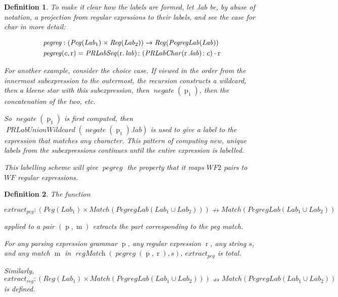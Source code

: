 \documentclass[11pt]{article}
\newcommand{\synPeg}{\ensuremath{\operatorname{p}}}
\newcommand{\synReg}{\ensuremath{\operatorname{r}}}
\newcommand{\metaMatch}{\ensuremath{\operatorname{m}}}
\newcommand{\setPeg}{\mathit{Peg}}
\newcommand{\setReg}{\mathit{Reg}}
\newcommand{\setWF}{\mathit{WF}}
\newcommand{\setWFTwo}{\mathit{WF2}}
\newcommand{\setMatch}{\mathit{Match}}
\newcommand{\setLab}{\mathit{Lab}}
\newcommand{\setPegregLab}{\mathit{PegregLab}}
\newcommand{\funPEGREG}{\operatorname{\mathit{pegreg}}}
\newcommand{\funRegMatch}{\operatorname{\mathit{regMatch}}}
\newcommand{\funNegate}{\operatorname{\mathit{negate}}}
\newcommand{\funExtractPeg}{\operatorname{\mathit{extract_{peg}}}}
\newcommand{\funExtractReg}{\operatorname{\mathit{extract_{reg}}}}
\newtheorem{definition}{Definition}
\begin{document}
\begin{definition}
To make it clear how the labels are formed, let $.\mathit{lab}$ be, by abuse of
notation, a projection from regular exprssions to their labels, and see the
case for char in more detail:

\begin{alignat}{2}& \notag
 \funPEGREG : (\setPeg(\setLab_1) \times \setReg(\setLab_2)) \to \setReg(\setPegregLab(\setLab)) \\& \notag
  \funPEGREG(c, \synReg)  =  \operatorname{\mathit{PRLabSeq}(\synReg.\mathit{lab})}\colon %
                     (\operatorname{\mathit{PRLabChar}}(\synReg.\mathit{lab})\colon c) \cdot \synReg
\end{alignat}

For another example, consider the choice case. If viewed in the order
from the innermost subexpression to the outermost, the recursion constructs
a wildcard, then a kleene star with this subexpression,
then $\funNegate(\synPeg_1)$, then the concatenation of the two, etc.

So $\funNegate(\synPeg_1)$ is first computed, then
$\operatorname{\mathit{PRLabUnionWildcard}}(\funNegate(\synPeg_1).\mathit{lab})$ is used to give
a label to the expression that matches any character. This pattern of computing
new, unique labels from the subexpressions continues until the entire expression
is labelled.

This labelling scheme will give $\funPEGREG$ the property that it maps $\setWFTwo$ pairs to
$\setWF$ regular expressions.
\end{definition}

\begin{definition}
  The function

  $\funExtractPeg : (\setPeg(\setLab_1) \times
                    \setMatch(\setPegregLab(\setLab_1 \cup \setLab_2))) \nrightarrow
                    \setMatch(\setPegregLab(\setLab_1 \cup \setLab_2))$

   applied to a pair $(\synPeg, \metaMatch)$ extracts the part corresponding to the
   peg match.

   For any parsing expression grammar $\synPeg$,
   any regular expression $\synReg$, any string $s$,
   and any match $\metaMatch$ in $\funRegMatch(\funPEGREG(\synPeg, \synReg), s)$,
   $\funExtractPeg$ is total.

   Similarly,
  $\funExtractReg : (\setReg(\setLab_1) \times
                    \setMatch(\setPegregLab(\setLab_1 \cup \setLab_2))) \nrightarrow
                    \setMatch(\setPegregLab(\setLab_1 \cup \setLab_2))$
   is defined.
\end{definition}
\end{document}
